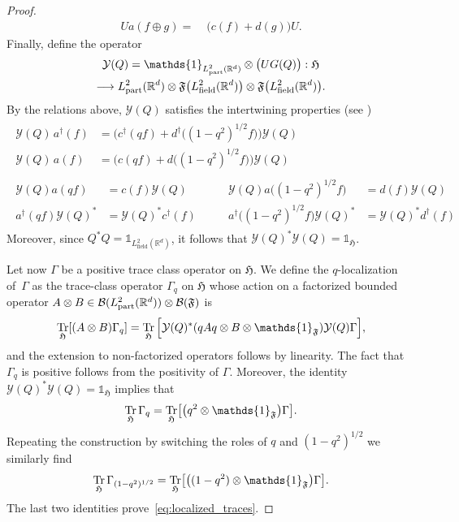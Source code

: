 \documentclass[AHL,Unicode,longabstracts,published]{cedram}
\DeclareMathOperator{\Tr}{Tr}
\DeclareMathOperator{\partt}{part}
\DeclareMathOperator{\field}{field}
\newcommand{\cY}{\mathcal{Y}}
\newcommand{\R}{\mathbb{R}}
\newcommand{\gH}{\mathfrak{H}}
\newcommand{\gF}{\mathfrak{F}}
\newcommand{\cB}{\mathcal{B}}
\newcommand{\1}{\mathds{1}}
\let\oldin\in
\renewcommand{\in}{\mathchoice{\oldin}{\oldin}{\,\oldin\,}{\,\oldin\,}}
\renewcommand*{\to}{\mathchoice{\longrightarrow}{\rightarrow}{\rightarrow}{\rightarrow}}
\let\originalleft\left
\let\originalright\right
\renewcommand{\left}{\mathopen{}\mathclose\bgroup\originalleft}
\renewcommand{\right}{\aftergroup\egroup\originalright}
\begin{document}
\begin{proof}
\begin{equation}
\begin{split}
Ua(f\oplus g)=\;&\big(c(f)+d(g)\big)U.
\end{split}
\end{equation}
Finally, define the operator
\begin{multline}
\cY(Q)= \1_{L^2_{\partt}(\R^d)}\otimes \big(UG(Q)\big): \gH\\
\to L^2_{\partt}(\R^d) \otimes \gF\big(L^2_{\field}(\R^d)\big) \otimes \gF\big(L^2_{\field}(\R^d)\big).
\end{multline}
By the relations above, $\cY(Q)$ satisfies the intertwining properties (see \cite[Lemmas~2.14 and 2.15]{DerGer-99})
\begin{equation}\label{eq:intertwining}
\begin{gathered}
\begin{aligned}
\cY(Q)\,a^\dagger(f) &= \Big(c^\dagger(qf)+d^\dagger\big((1-q^2)^{1/2}f\big) \Big)\cY(Q)\\
\cY(Q)\,a(f)&= \Big(c(qf)+d\big((1-q^2)^{1/2}f\big) \Big)\cY(Q)
\end{aligned}
\\
\begin{aligned}
\cY(Q)a(qf) &=c(f)\cY (Q)\qquad &\cY(Q)a\big((1-q^2)^{1/2}f\big) &=d(f)\cY(Q)\\
a^\dagger(qf)\cY(Q)^* &= \cY(Q)^*c^\dagger(f)\qquad &a^\dagger\big((1-q^2)^{1/2}f\big)\cY(Q)^* &= \cY(Q)^*d^\dagger(f)
\end{aligned}
\end{gathered}
\end{equation}
Moreover, since $Q^*Q=\1_{L^2_{\field}(\R^d)}$, it follows that $\cY(Q)^*\cY(Q)=\1_{ \gH}$.

Let now $\Gamma$ be a positive trace class operator on $ \gH$. We define the $q$-localization of~$\Gamma$ as the trace-class operator $\Gamma_q$ on $ \gH$ whose action on a factorized bounded operator $A\otimes B \in \cB(L^2_{\partt}(\R^d))\otimes \cB(\gF)$ is
\begin{equation}
\Tr_{ \gH}\left[(A\otimes B) \Gamma_q \right]=\Tr_{ \gH}\Big[\cY(Q)^* (qAq \otimes B \otimes \1_{\gF}) \cY(Q)\Gamma\Big],
\end{equation}
and the extension to non-factorized operators follows by linearity. The fact that $\Gamma_q$ is positive follows from the positivity of $\Gamma$. Moreover, the identity $\cY(Q)^* \cY(Q)=\1_{ \gH}$ implies that
\begin{equation}
\Tr_{ \gH} \Gamma_q=\Tr_{ \gH} \left[\big(q^2\otimes \1_{\gF}\big)\Gamma\right].
\end{equation}
Repeating the construction by switching the roles of $q$ and $(1-q^2)^{1/2}$ we similarly find
\begin{equation}
\Tr_{ \gH} \Gamma_{(1-q^2)^{1/2}}= \Tr_{ \gH}\left[\big((1-q^2)\otimes \1_{\gF}\big)\Gamma\right].
\end{equation}
The last two identities prove~\eqref{eq:localized_traces}.



\end{proof}
\end{document}
